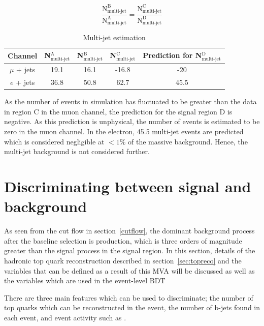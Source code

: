 \begin{equation}
\frac{\textrm{N}^{\textrm{B}}_{\textrm{multi-jet}}}{\textrm{N}^{\textrm{A}}_{\textrm{multi-jet}}} = \frac{\textrm{N}^{\textrm{C}}_{\textrm{multi-jet}}}{\textrm{N}^{\textrm{D}}_{\textrm{multi-jet}}}
\label{N-multi-jet}
\end{equation}

\begin{table}[ht!]
\caption{Multi-jet estimation}
\centering
\begin{tabular}{|c |c |c |c |c |}
 \hline 
 Channel & N$^{\textrm{A}}_{\textrm{multi-jet}}$  & N$^{\textrm{B}}_{\textrm{multi-jet}}$ & N$^{\textrm{C}}_{\textrm{multi-jet}}$ & Prediction for N$^{\textrm{D}}_{\textrm{multi-jet}}$  \\
  \hline
$\mu$ + jets & 19.1 & 16.1 & -16.8 & -20  \\
 \hline
$e$ + jets & 36.8  & 50.8 & 62.7 &45.5  \\
\hline
\end{tabular}
\label{tab:multijet}
\end{table}

As the number of \ttbar events in simulation has fluctuated to be greater than the data in region C in the muon channel, the prediction for the signal region D is negative. As this prediction is unphysical, the number of events is estimated to be zero in the muon channel. In the electron, 45.5 multi-jet events are predicted which is considered negligible at $<1\%$ of the massive \ttbar background. Hence, the multi-jet background is not considered further.

\section{Discriminating between signal and background}
\label{sec:discriminating}
As seen from the cut flow in section~\ref{cutflow}, the dominant background process after the baseline selection is \ttbar production, which is three orders of magnitude greater than the \tttt signal process in the signal region.
In this section, details of the hadronic top quark reconstruction described in section~\ref{sec:topreco} and the variables that can be defined as a result of this MVA will be discussed as well as the variables which are used in the event-level BDT

  There are three main features which can be used to discriminate; the number of top quarks which can be reconstructed in the event, the number of b-jets found in each event, and event activity such as \HT.

